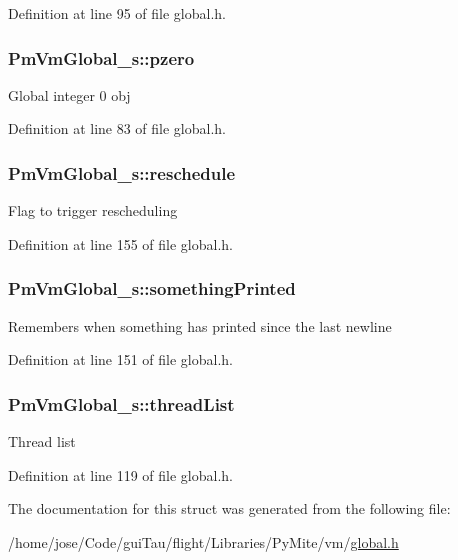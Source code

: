 Definition at line 95 of file global.\-h.

\hypertarget{struct_pm_vm_global__s_a28d5b7332d6e8e9e0cba479873d9d189}{
\subsubsection[{pzero}]{ Pm\-Vm\-Global\-\_\-s\-::pzero}}\label{struct_pm_vm_global__s_a28d5b7332d6e8e9e0cba479873d9d189}
Global integer 0 obj 

Definition at line 83 of file global.\-h.

\hypertarget{struct_pm_vm_global__s_a0ed6c7906e34fb8f71b5ad2ef9fc946c}{
\subsubsection[{reschedule}]{ Pm\-Vm\-Global\-\_\-s\-::reschedule}}\label{struct_pm_vm_global__s_a0ed6c7906e34fb8f71b5ad2ef9fc946c}
Flag to trigger rescheduling 

Definition at line 155 of file global.\-h.

\hypertarget{struct_pm_vm_global__s_a38e065bbec6640f0d1db118dc74eb5d6}{
\subsubsection[{something\-Printed}]{ Pm\-Vm\-Global\-\_\-s\-::something\-Printed}}\label{struct_pm_vm_global__s_a38e065bbec6640f0d1db118dc74eb5d6}
Remembers when something has printed since the last newline 

Definition at line 151 of file global.\-h.

\hypertarget{struct_pm_vm_global__s_a94e6bed09a25ddfc7afd432c0d6f2f69}{
\subsubsection[{thread\-List}]{ Pm\-Vm\-Global\-\_\-s\-::thread\-List}}\label{struct_pm_vm_global__s_a94e6bed09a25ddfc7afd432c0d6f2f69}
Thread list 

Definition at line 119 of file global.\-h.



The documentation for this struct was generated from the following file\-:\begin{DoxyCompactItemize}
\item 
/home/jose/\-Code/gui\-Tau/flight/\-Libraries/\-Py\-Mite/vm/\hyperlink{global_8h}{global.\-h}\end{DoxyCompactItemize}
